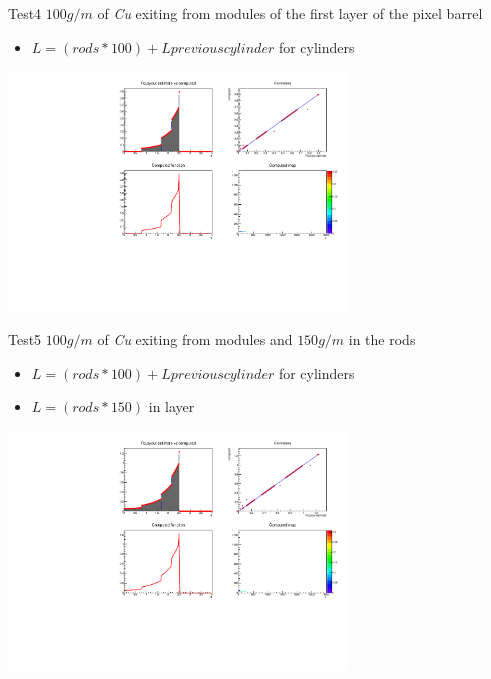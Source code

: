 \documentclass[pdftex, 11pt]{beamer}
\begin{document}
\begin{frame}
  \begin{block}{Test4}
    \alert{$100 g/m$} of \emph{Cu} exiting from modules of the first layer of the pixel barrel
    \begin{itemize}
    \item \alert{$L=(rods*100) + L{previous cylinder}$} for cylinders
    \end{itemize}
  \end{block}
  \begin{center}
    \includegraphics[width=9cm]{img/test4.pdf}
  \end{center}
\end{frame}

\begin{frame}
  \begin{block}{Test5}
    \alert{$100 g/m$} of \emph{Cu} exiting from modules and \alert{$150 g/m$} in the rods
    \begin{itemize}
    \item \alert{$L=(rods*100) + L{previous cylinder}$} for cylinders
    \item \alert{$L=(rods*150)$} in layer
    \end{itemize}
  \end{block}
  \begin{center}
    \includegraphics[width=9cm]{img/test5.pdf}
  \end{center}
\end{frame}
\end{document}
